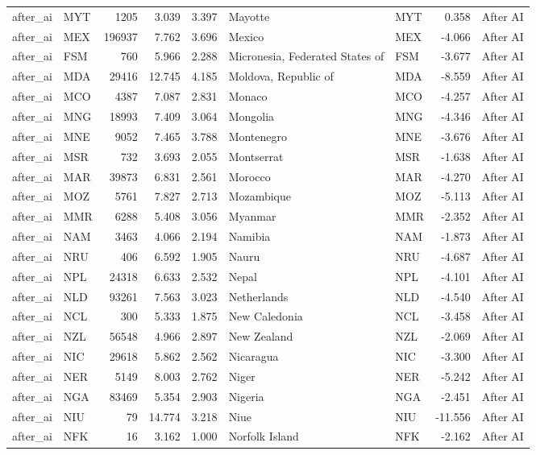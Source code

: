 \begin{tabular}{llrrrllrl}
after\_ai & MYT & 1205 & 3.039 & 3.397 & Mayotte & MYT & 0.358 & After AI \\
after\_ai & MEX & 196937 & 7.762 & 3.696 & Mexico & MEX & -4.066 & After AI \\
after\_ai & FSM & 760 & 5.966 & 2.288 & Micronesia, Federated States of & FSM & -3.677 & After AI \\
after\_ai & MDA & 29416 & 12.745 & 4.185 & Moldova, Republic of & MDA & -8.559 & After AI \\
after\_ai & MCO & 4387 & 7.087 & 2.831 & Monaco & MCO & -4.257 & After AI \\
after\_ai & MNG & 18993 & 7.409 & 3.064 & Mongolia & MNG & -4.346 & After AI \\
after\_ai & MNE & 9052 & 7.465 & 3.788 & Montenegro & MNE & -3.676 & After AI \\
after\_ai & MSR & 732 & 3.693 & 2.055 & Montserrat & MSR & -1.638 & After AI \\
after\_ai & MAR & 39873 & 6.831 & 2.561 & Morocco & MAR & -4.270 & After AI \\
after\_ai & MOZ & 5761 & 7.827 & 2.713 & Mozambique & MOZ & -5.113 & After AI \\
after\_ai & MMR & 6288 & 5.408 & 3.056 & Myanmar & MMR & -2.352 & After AI \\
after\_ai & NAM & 3463 & 4.066 & 2.194 & Namibia & NAM & -1.873 & After AI \\
after\_ai & NRU & 406 & 6.592 & 1.905 & Nauru & NRU & -4.687 & After AI \\
after\_ai & NPL & 24318 & 6.633 & 2.532 & Nepal & NPL & -4.101 & After AI \\
after\_ai & NLD & 93261 & 7.563 & 3.023 & Netherlands & NLD & -4.540 & After AI \\
after\_ai & NCL & 300 & 5.333 & 1.875 & New Caledonia & NCL & -3.458 & After AI \\
after\_ai & NZL & 56548 & 4.966 & 2.897 & New Zealand & NZL & -2.069 & After AI \\
after\_ai & NIC & 29618 & 5.862 & 2.562 & Nicaragua & NIC & -3.300 & After AI \\
after\_ai & NER & 5149 & 8.003 & 2.762 & Niger & NER & -5.242 & After AI \\
after\_ai & NGA & 83469 & 5.354 & 2.903 & Nigeria & NGA & -2.451 & After AI \\
after\_ai & NIU & 79 & 14.774 & 3.218 & Niue & NIU & -11.556 & After AI \\
after\_ai & NFK & 16 & 3.162 & 1.000 & Norfolk Island & NFK & -2.162 & After AI \\

\end{tabular}
